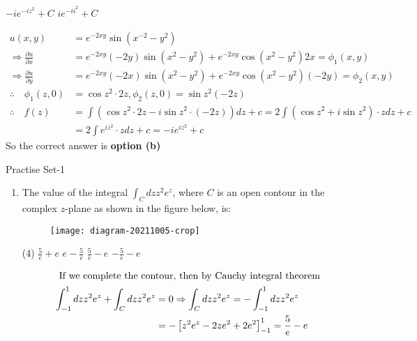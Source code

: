 \begin{note}
\begin{exercise}
\begin{tasks}
			\task[\textbf{c.}] $-i e^{-i z^{2}}+C$
			\task[\textbf{d.}] $i e^{-i i^{2}}+C$
		\end{tasks}
	\end{exercise}
	\begin{answer}
		\begin{align*}
		u(x, y)&=e^{-2 x y} \sin \left(x^{-2}-y^{2}\right) \\
		\Rightarrow \frac{\partial u}{\partial x}&=e^{-2 x y}(-2 y) \sin \left(x^{2}-y^{2}\right)+e^{-2 x y} \cos \left(x^{2}-y^{2}\right) 2 x=\phi_{1}(x, y) \\
		\Rightarrow \frac{\partial u}{\partial y}&=e^{-2 x y}(-2 x) \sin \left(x^{2}-y^{2}\right)+e^{-2 x y} \cos \left(x^{2}-y^{2}\right)(-2 y)=\phi_{2}(x, y)\\
		\therefore \quad \phi_{1}(z, 0) &=\cos z^{2} \cdot 2 z, \phi_{2}(z, 0)=\sin z^{2}(-2 z) \\
		\therefore \quad f(z) &=\int\left(\cos z^{2} \cdot 2 z-i \sin z^{2} \cdot(-2 z)\right) d z+c=2 \int\left(\cos z^{2}+i \sin z^{2}\right) \cdot z d z+c \\
		&=2 \int e^{i z^{2}} \cdot z d z+c=-i e^{i z^{2}}+c
		\end{align*}
		So the correct answer is \textbf{option (b)}
	\end{answer}
\newpage
\begin{abox}
	Practise Set-1
	\end{abox}
\begin{enumerate}[label=\color{ocre}\textbf{\arabic*.}]
	\item The value of the integral $\int_{C} d z z^{2} e^{z}$, where $C$ is an open contour in the complex $z$-plane as shown in the figure below, is:
	{}
	\begin{figure}[H]
		\centering
		\texttt{[image: diagram-20211005-crop]}
	\end{figure}
	\begin{tasks}(4)
		\task[\textbf{A.}] $\frac{5}{e}+e$
		\task[\textbf{B.}] $e-\frac{5}{e}$
		\task[\textbf{C.}] $\frac{5}{e}-e$
		\task[\textbf{D.}] $-\frac{5}{e}-e$
	\end{tasks}
	\begin{answer}
		\begin{align*}
		\intertext { If we complete the contour, then by Cauchy integral theorem }
		\int_{-1}^{1} d z z^{2} e^{z}+\int_{C} d z z^{2} e^{z}&=0 \Rightarrow \int_{C} d z z^{2} e^{z}=-\int_{-1}^{1} d z z^{2} e^{z}\\&=-\left[z^{2} e^{z}-2 z e^{2}+2 e^{2}\right]_{-1}^{1}=\frac{5}{e}-e

\end{align*}
\end{answer}
\end{enumerate}
\end{note}
